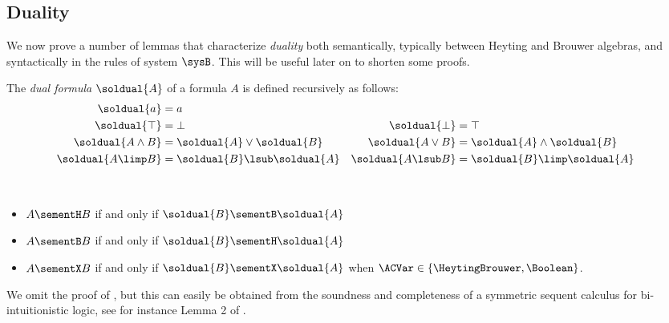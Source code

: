 \subsection{Duality}

We now prove a number of lemmas that characterize \emph{duality} both
semantically, typically between Heyting and Brouwer algebras, and syntactically
in the rules of system $\sysB$. This will be useful later on to shorten some
proofs.

\begin{definition}
  The \emph{dual formula} $\soldual{A}$ of a formula $A$ is defined recursively
  as follows:
  \begin{align*}
    \soldual{a} &= a &\\
    \soldual{\top} &= \bot &
    \soldual{\bot} &= \top \\
    \soldual{A \land B} &= \soldual{A} \lor \soldual{B} &
    \soldual{A \lor B} &= \soldual{A} \land \soldual{B} \\
    \soldual{A \limp B} &= \soldual{B} \lsub \soldual{A} &
    \soldual{A \lsub B} &= \soldual{B} \limp \soldual{A}
  \end{align*}
\end{definition}

\begin{fact}[Duality]
  ~\\\vspace{-1em}
  \begin{itemize}
    \item $A \sementH B$ if and only if $\soldual{B} \sementB \soldual{A}$
    \item $A \sementB B$ if and only if $\soldual{B} \sementH \soldual{A}$
    \item $A \sementX B$ if and only if $\soldual{B} \sementX \soldual{A}$ when $\ACVar
    \in \{\HeytingBrouwer, \Boolean\}$.
  \end{itemize}
\end{fact}

We omit the proof of , but this can easily be obtained from the
soundness and completeness of a symmetric sequent calculus for bi-intuitionistic
logic, see for instance Lemma 2 of .

